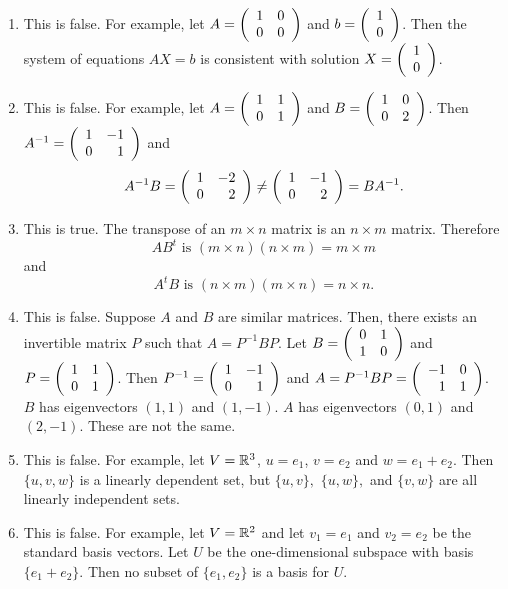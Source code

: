 \documentclass{ximera}
\begin{document}
\begin{exercise}
\begin{solution}
\soln \begin{enumerate}%
\item This is false. For example, let $A=\left(\begin{array}{rrrrrrrrrrrrrrrrrr} 1 & 0 \\ 0 & 0 \end{array}\right)$ and $b=\left(\begin{array}{rrrrrrrrrrrrrrrrrr} 1\\0 \end{array}\right)$. Then the system of equations $AX=b$ is consistent with solution $X=\left(\begin{array}{rrrrrrrrrrrrrrrrrr} 1\\0 \end{array}\right)$. 

\item This is false. For example, let $A=\left(\begin{array}{rrrrrrrrrrrrrrrrrr} 1 & 1\\ 0 & 1 \end{array}\right)$ and $B=\left(\begin{array}{rrrrrrrrrrrrrrrrrr} 1 & 0\\ 0 & 2 \end{array}\right)$. Then $A^{-1}=\left(\begin{array}{rrrrrrrrrrrrrrrrrr} 1 & -1\\ 0 & 1 \end{array}\right)$ and 
\[
A^{-1}B = \left(\begin{array}{rrrrrrrrrrrrrrrrrr} 1 & -2\\ 0 & 2 \end{array}\right) \neq \left(\begin{array}{rrrrrrrrrrrrrrrrrr} 1 & -1\\ 0 & 2 \end{array}\right) = BA^{-1}.
\]

\item This is true.  The transpose of an $m\times n$ matrix is an $n\times m$ matrix. Therefore 
\[
AB^t \mbox{ is }  (m\times n)(n\times m) = m\times m
\]
and
\[
A^tB \mbox{ is }  (n\times m)(m\times n) = n\times n.
\]

\item This is false. Suppose $A$ and $B$ are similar matrices. Then, there exists an invertible matrix $P$ such that $A=P^{-1}BP$. Let $B=\left(\begin{array}{rrrrrrrrrrrrrrrrrr}  0 & 1 \\ 1 & 0 \end{array}\right)$ and $P=\left(\begin{array}{rrrrrrrrrrrrrrrrrr}  1 & 1 \\ 0 & 1 \end{array}\right)$. Then $P^{-1}=\left(\begin{array}{rrrrrrrrrrrrrrrrrr}  1 & -1 \\ 0 & 1 \end{array}\right)$ and $A=P^{-1}BP=\left(\begin{array}{rrrrrrrrrrrrrrrrrr}  -1 & 0 \\ 1 & 1 \end{array}\right)$. $B$ has eigenvectors $(1,1)$ and $(1,-1)$. $A$ has eigenvectors $(0,1)$ and $(2,-1)$. These are not the same. 

\item This is false. For example, let $V={\mathbb R}^3$, $u=e_1$, $v=e_2$ and $w=e_1+e_2$. Then $\{u,v,w\}$ is a linearly dependent set, but $\{u,v\},$ $\{u,w\},$ and $\{v,w\}$ are all linearly independent sets.

\item This is false. For example, let $V={\mathbb R}^2$ and let $v_1=e_1$ and $v_2=e_2$ be the standard basis vectors. Let $U$ be the one-dimensional subspace with basis $\{e_1+e_2\}$. Then no subset of $\{e_1,e_2\}$ is a basis for $U$.
\end{enumerate}
\end{solution}
\end{exercise}


\end{document}
